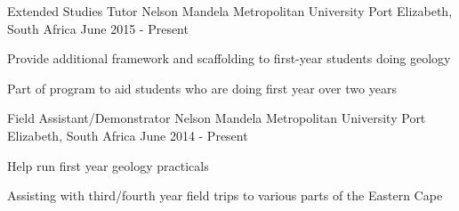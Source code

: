 


\begin{cventries}


\cventry
{Extended Studies Tutor} %
{Nelson Mandela Metropolitan University} %
{Port Elizabeth, South Africa} %
{June 2015 - Present} %
{ %
\begin{cvitems}
\item {Provide additional framework and scaffolding to first-year students doing geology}
\item {Part of program to aid students who are doing first year over two years}
\end{cvitems}
}


\cventry
{Field Assistant/Demonstrator} %
{Nelson Mandela Metropolitan University} %
{Port Elizabeth, South Africa} %
{June 2014 - Present} %
{ %
\begin{cvitems}
\item {Help run first year geology practicals}
\item {Assisting with third/fourth year field trips to various parts of the Eastern Cape}
\end{cvitems}
}



\end{cventries}
